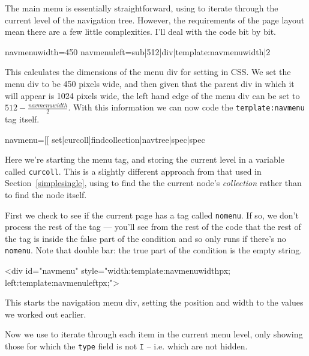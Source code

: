 The main menu is essentially straightforward, using  to iterate through the current
level of the navigation tree. However, the requirements of the page layout mean there are
a few little complexities. I'll deal with the code bit by bit.
\begin{MyVerbatim}
navmenuwidth=450
navmenuleft={{sub|512|{{div|{{template:navmenuwidth}}|2}}}}
\end{MyVerbatim}
This calculates the dimensions of the menu div for setting in CSS. We
set the menu div to be 450 pixels wide, and then given that the parent
div in which it will appear is 1024 pixels wide, the left hand edge of
the menu div can be set to $512-\frac{navmenuwidth}{2}$. With this information we 
can now code the \texttt{template:navmenu} tag itself.
\begin{MyVerbatim}
navmenu=[[
    {{set|curcoll|{{findcollection|{{navtree}}|spec|{spec}}}}}
\end{MyVerbatim}
Here we're starting the menu tag, and storing the current level in a variable
called \texttt{curcoll}. This is a slightly different approach from that used
in Section~\ref{simplesingle}, using  to find the the current node's
\emph{collection} rather than  to find the node itself.
\begin{MyVerbatim}
{{iftagexists|page:nomenu||
    {{marktree|{{navtree}}|spec|{{spec}}}}
\end{MyVerbatim}
First we check to see if the current page has a tag called \texttt{nomenu}. If so, 
we don't process the rest of the tag --- you'll see from the rest of the code
that the rest of the tag is inside the false part of the  condition
and so only runs if there's no \texttt{nomenu}. Note that double bar: the true part
of the condition is the empty string.
\begin{MyVerbatim}
    <div id="navmenu" style="width:{{template:navmenuwidth}}px;
                            left:{{template:navmenuleft}}px;">
\end{MyVerbatim}
This starts the navigation menu div, setting the position and width to the values we
worked out earlier.
\begin{MyVerbatim}
    {{foreach|{{curcoll}}|a|
        {{streq|{{a:type}}|I||
\end{MyVerbatim}
Now we use  to iterate through each item in the current menu level, only showing those for
which the \texttt{type} field is not \texttt{I} -- i.e. which are not hidden.
\begin{MyVerbatim}
        {{iftagtrue|a:issel|
            <span>{{a:name}}</span>|
\end{MyVerbatim}
